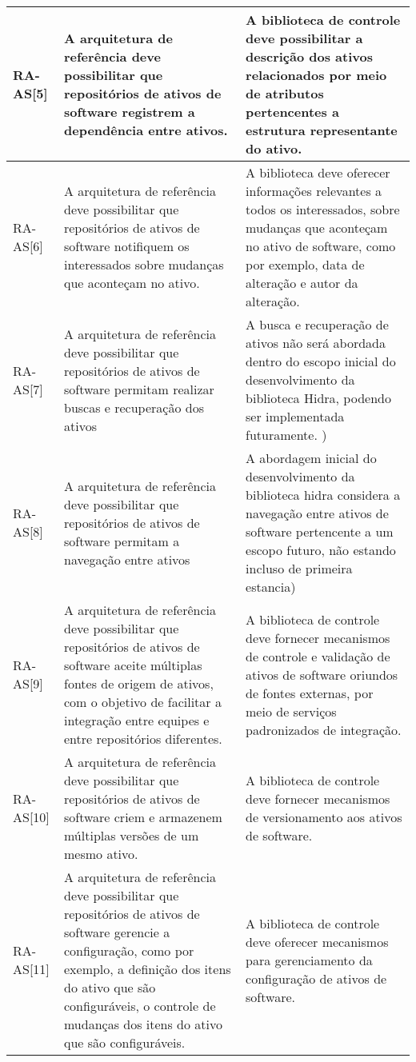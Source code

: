 \begin{longtable}{ | l | p{6cm} | p{6cm} |}
     RA-AS[5] 
     & A arquitetura de referência deve possibilitar que repositórios de ativos de software registrem a dependência entre ativos.
     & A biblioteca de controle deve possibilitar a descrição dos ativos relacionados por meio de atributos pertencentes a estrutura representante do ativo.
 \\ \hline

    RA-AS[6] 
    & A arquitetura de referência deve possibilitar que repositórios de ativos de software notifiquem os interessados sobre mudanças que aconteçam no ativo. 
    & A biblioteca deve oferecer informações relevantes a todos os interessados, sobre mudanças que aconteçam no ativo de software, como por exemplo, data de alteração e autor da alteração.
 \\ \hline
 
    RA-AS[7] 
    & A arquitetura de referência deve possibilitar que  repositórios de ativos de software permitam realizar  buscas e recuperação dos ativos 
    & A busca e recuperação de ativos não será abordada dentro do escopo inicial do desenvolvimento da biblioteca Hidra, podendo ser implementada futuramente. ) \\ \hline
    
    RA-AS[8] 
    & A arquitetura de referência deve possibilitar que  repositórios de ativos de software permitam a  navegação entre ativos 
    & A abordagem inicial do desenvolvimento da biblioteca hidra considera a navegação entre ativos de software pertencente a um escopo futuro, não estando incluso de primeira estancia) \\ \hline
    
    RA-AS[9] 
    & A arquitetura de referência deve possibilitar que  repositórios de ativos de software aceite múltiplas  fontes de origem de ativos, com o objetivo de facilitar  a integração entre equipes e entre repositórios  diferentes.  
    & A biblioteca de controle  deve fornecer mecanismos de controle e validação de ativos de software oriundos de fontes externas, por meio de serviços padronizados de integração.
 \\ \hline
 
    RA-AS[10]
    & A arquitetura de referência deve possibilitar que  repositórios de ativos de software criem e armazenem  múltiplas versões de um mesmo ativo.
    & A biblioteca de controle deve fornecer mecanismos de versionamento aos ativos de software. \\ \hline
    
    RA-AS[11] 
    & A arquitetura de referência deve possibilitar que  repositórios de ativos de software gerencie a  configuração, como por exemplo, a definição dos itens  do ativo que são configuráveis, o controle de  mudanças dos itens do ativo que são configuráveis.
    & A biblioteca de controle deve oferecer mecanismos  para  gerenciamento da configuração de ativos de software.  \\ \hline
    

\end{longtable}
